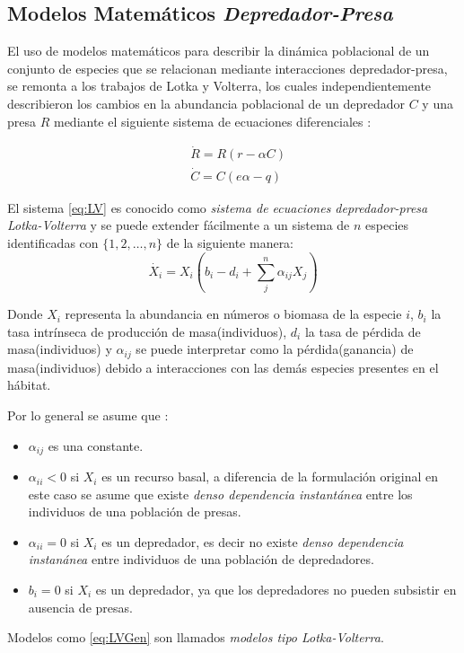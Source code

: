 

\subsection{Modelos Matem\'aticos \emph{Depredador-Presa}}

El uso de modelos matem\'aticos para describir la din\'amica poblacional de un conjunto de especies que se relacionan mediante interacciones depredador-presa, se remonta a los trabajos de Lotka y Volterra\citep{gotelliprimer}, los cuales independientemente describieron los cambios en la abundancia poblacional de un depredador $C$ y una presa $R$ mediante el siguiente sistema de ecuaciones diferenciales : 

\begin{equation}\label{eq:LV}
\begin{aligned}
&\dot{R} = R(r - \alpha C)\\
&\dot{C} = C(e\alpha - q) 
\end{aligned}
\end{equation}

El sistema \eqref{eq:LV} es conocido como \emph{sistema de ecuaciones depredador-presa Lotka-Volterra} y se puede extender f\'acilmente a un sistema de $n$ especies identificadas con $\{1,2, \ldots ,n\}$ de la siguiente manera:
\begin{equation}\label{eq:LVGen}
\dot{X_i}  = X_i(b_i - d_i + \sum_{j}^n \alpha_{ij} X_j)
\end{equation}

Donde $X_i$ representa la abundancia en n\'umeros o biomasa de la especie $i$, $b_i$ la tasa intr\'inseca de producci\'on de masa(individuos), $d_i$ la tasa de p\'erdida de masa(individuos) y $\alpha_{ij}$ se puede interpretar como la p\'erdida(ganancia) de masa(individuos) debido a interacciones con las dem\'as especies presentes en el h\'abitat.

Por lo general se asume que :
\begin{itemize}
\item $\alpha_{ij}$ es una constante.
\item $\alpha_{ii} < 0 $ si $X_i$ es un recurso basal, a diferencia de la formulaci\'on original en este caso se asume que existe \emph{denso dependencia instant\'anea} entre los individuos de una poblaci\'on de presas.
\item $\alpha_{ii} = 0 $ si $X_i$ es un depredador, es decir no existe \emph{denso dependencia instan\'anea} entre individuos de una poblaci\'on de depredadores.
\item $b_i = 0$ si $X_i$ es un depredador, ya que los depredadores no pueden subsistir en ausencia de presas.
\end{itemize}
Modelos como \eqref{eq:LVGen} son llamados \emph{modelos tipo Lotka-Volterra}.


